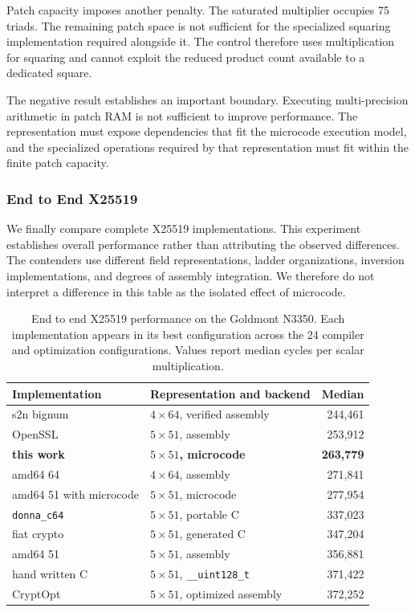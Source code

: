 \documentclass[journal=tches,submission]{iacrtrans}
\newcommand{\code}[1]{\texttt{#1}}
\begin{document}
Patch capacity imposes another penalty.
The saturated multiplier occupies 75 triads.
The remaining patch space is not sufficient for the specialized squaring implementation required alongside it.
The control therefore uses multiplication for squaring and cannot exploit the reduced product count available to a dedicated square.

The negative result establishes an important boundary.
Executing multi-precision arithmetic in patch RAM is not sufficient to improve performance.
The representation must expose dependencies that fit the microcode execution model, and the specialized operations required by that representation must fit within the finite patch capacity.

\subsubsection{End to End X25519}
\label{sec}

We finally compare complete X25519 implementations.
This experiment establishes overall performance rather than attributing the observed differences.
The contenders use different field representations, ladder organizations, inversion implementations, and degrees of assembly integration.
We therefore do not interpret a difference in this table as the isolated effect of microcode.

\begin{table}[!ht]
\centering
\caption{End to end X25519 performance on the Goldmont N3350.
Each implementation appears in its best configuration across the 24 compiler and optimization configurations.
Values report median cycles per scalar multiplication.}
\label{tab}
\footnotesize
\setlength{\tabcolsep}{4pt}
\begin{tabular}{@{}llr@{}}
\toprule
Implementation & Representation and backend & Median \\
\midrule
s2n bignum &
$4\times64$, verified assembly &
244,461 \\
OpenSSL &
$5\times51$, assembly &
253,912 \\
\textbf{this work} &
\textbf{$5\times51$, microcode} &
\textbf{263,779} \\
amd64 64 &
$4\times64$, assembly &
271,841 \\
amd64 51 with microcode &
$5\times51$, microcode &
277,954 \\
\code{donna\_c64} &
$5\times51$, portable C &
337,023 \\
fiat crypto &
$5\times51$, generated C &
347,204 \\
amd64 51 &
$5\times51$, assembly &
356,881 \\
hand written C &
$5\times51$, \code{\_\_uint128\_t} &
371,422 \\
CryptOpt &
$5\times51$, optimized assembly &
372,252 \\
\bottomrule
\end{tabular}
\end{table}
\end{document}
